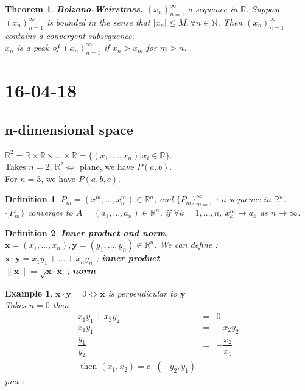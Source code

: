 \documentclass[a4paper,10pt]{article}
\newtheorem{theo}{Theorem}
\newtheorem{defi}{Definition}
\newtheorem{ex}{Example}
\newcommand{\R}{\mathbb{R}}
\newcommand{\bx}{\mathbf{x}}
\newcommand{\by}{\mathbf{y}}
\begin{document}
\begin{theo}
	\textbf{Bolzano-Weirstrass.} $ (x_{n})_{n=1}^{\infty} $ a sequence in $ \R $. Suppose $ (x_{n})_{n=1}^{\infty} $ is bounded in the sense that $ |x_{n}|\leq M, \forall n \in \mathbb{N} $. Then $ (x_{n})_{n=1}^{\infty} $ contains a convergent subsequence.\\
	$ x_{n} $ is a peak of $ (x_{n})_{n=1}^{\infty} $ if $ x_{n} > x_{m} $ for $ m>n $.
\end{theo}

\newpage
\section{16-04-18}

\subsection{n-dimensional space}
$ \R^2 = \R \times \R \times \dots \times \R  = \{ (x_{1}, \dots, x_{n}) | x_{i}\in \R \} $.\\
Takes $ n=2 $, $ \R^2  \Leftrightarrow $ plane, we have $ P(a,b) $.\\
For $ n=3 $, we have $ P(a,b,c) $.

\begin{defi}
	$ P_{m} = (x_{1}^{m}, \dots, x_{n}^{m}) \in \R^n$, and $ \{ P_{m} \}_{m=1}^{\infty} $ :  a sequence in $ \R^{n} $.\\
	 $ \{P_{m}\} $ converges to $ A = (a_{1}, \dots , a_{n}) \in \R^n $, if $ \forall k=1, \dots, n , \ x_{k}^{m} \rightarrow a_{k} $ as $ n \rightarrow \infty $.
\end{defi}

\begin{defi}
	\textbf{Inner product and norm}.\\
	$ \bx = (x_{1}, \dots, x_{n}) , \by = (y_{1}, \dots, y_{n}  ) \in \R^n $. We can define : \\
	$ \bx \cdot \by = x_{1}y_{1} + \dots + x_{n}y_{n} $ ; \textbf{inner product}\\
	$ \| \bx \|= \sqrt{\bx \cdot \bx} $ ; \textbf{norm}
\end{defi}

\begin{ex}
	$ \bx \cdot \by =0 \Leftrightarrow \bx $ is perpendicular to $ \by $\\
	Takes $ n=0 $ then
	\begin{eqnarray} \nonumber
	x_{1}y_{1} + x_{2}y_{2} &=& 0 \\ \nonumber
	x_{1}y_{1} &=& -x_{2}y_{2} \\ \nonumber
	\dfrac{y_{1}}{y_{2}} &=& - \dfrac{x_{2}}{x_{1}}\\ \nonumber
	\text{ then } (x_{1},x_{2}) = c \cdot(-y_{2},y_{1})
	\end{eqnarray}
	pict : 
\end{ex}
\end{document}

